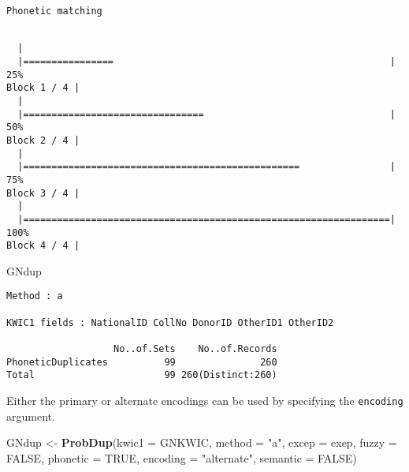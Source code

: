 \documentclass[]{article}
\newenvironment{Shaded}{\begin{snugshade}}{\end{snugshade}}
\newcommand{\DataTypeTok}[1]{\textcolor[rgb]{0.13,0.29,0.53}{#1}}
\newcommand{\KeywordTok}[1]{\textcolor[rgb]{0.13,0.29,0.53}{\textbf{#1}}}
\newcommand{\NormalTok}[1]{#1}
\newcommand{\OtherTok}[1]{\textcolor[rgb]{0.56,0.35,0.01}{#1}}
\newcommand{\StringTok}[1]{\textcolor[rgb]{0.31,0.60,0.02}{#1}}
\begin{document}
\begin{verbatim}
Phonetic matching
\end{verbatim}

\begin{verbatim}

  |                                                                       
  |================                                                 |  25%
Block 1 / 4 |
  |                                                                       
  |================================                                 |  50%
Block 2 / 4 |
  |                                                                       
  |=================================================                |  75%
Block 3 / 4 |
  |                                                                       
  |=================================================================| 100%
Block 4 / 4 |
\end{verbatim}

\begin{Shaded}
\begin{Highlighting}[]
\NormalTok{GNdup}
\end{Highlighting}
\end{Shaded}

\begin{verbatim}
Method : a

KWIC1 fields : NationalID CollNo DonorID OtherID1 OtherID2
 
                   No..of.Sets    No..of.Records
PhoneticDuplicates          99               260
Total                       99 260(Distinct:260)
\end{verbatim}

Either the primary or alternate encodings can be used by specifying the
\texttt{encoding} argument.

\begin{Shaded}
\begin{Highlighting}[]
\NormalTok{GNdup <-}\StringTok{ }\KeywordTok{ProbDup}\NormalTok{(}\DataTypeTok{kwic1 =}\NormalTok{ GNKWIC, }\DataTypeTok{method =} \StringTok{"a"}\NormalTok{, }\DataTypeTok{excep =}\NormalTok{ exep, }
                 \DataTypeTok{fuzzy =} \OtherTok{FALSE}\NormalTok{,}
                 \DataTypeTok{phonetic =} \OtherTok{TRUE}\NormalTok{, }\DataTypeTok{encoding =} \StringTok{"alternate"}\NormalTok{,}
                 \DataTypeTok{semantic =} \OtherTok{FALSE}\NormalTok{)}
\end{Highlighting}
\end{Shaded}
\end{document}
